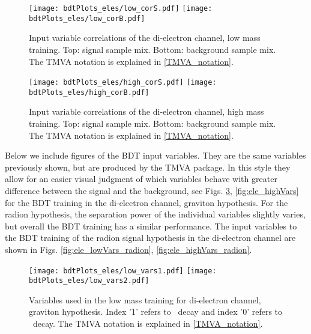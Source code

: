 \begin{figure}[tbp]
\begin{center}
\texttt{[image: bdtPlots\_eles/low\_corS.pdf]}
\texttt{[image: bdtPlots\_eles/low\_corB.pdf]}
\caption[Input variable correlations of the di-electron channel, low mass training.]{ Input variable correlations of the di-electron channel, low mass training. Top: signal sample mix. Bottom: background sample mix. The TMVA notation is explained in \ref{TMVA_notation}.}
\label{fig:ele_cors_low}
\end{center}
\end{figure}

\begin{figure}[tbp]
\begin{center}
\texttt{[image: bdtPlots\_eles/high\_corS.pdf]}
\texttt{[image: bdtPlots\_eles/high\_corB.pdf]}
\caption[Input variable correlations of the di-electron channel, high mass training.]{ Input variable correlations of the di-electron channel, high mass training. Top: signal sample mix. Bottom: background sample mix. The TMVA notation is explained in \ref{TMVA_notation}.}
\label{fig:ele_cors_high}
\end{center}
\end{figure}

Below we include figures of the BDT input variables. They are the same variables previously shown, but are produced by the TMVA package. In this style they allow for an easier visual judgment of which variables behave with greater difference between the signal and the background, see Figs. \ref{fig:ele_lowVars}, \ref{fig:ele_highVars} for the BDT training in the di-electron channel, graviton hypothesis. For the radion hypothesis, the separation power of the individual variables slightly varies, but overall the BDT training has a similar performance. The input variables to the BDT training of the radion signal hypothesis in the di-electron channel are shown in Figs. \ref{fig:ele_lowVars_radion}, \ref{fig:ele_highVars_radion}.

\begin{figure}[H]
\begin{center}
\texttt{[image: bdtPlots\_eles/low\_vars1.pdf]}
\texttt{[image: bdtPlots\_eles/low\_vars2.pdf]}
\caption[Variables used in the low mass training for di-electron channel, graviton hypothesis.]{ Variables used in the low mass training for di-electron channel, graviton hypothesis. Index '1' refers to \HBB~decay and index '0' refers to \HZZ~decay. The TMVA notation is explained in \ref{TMVA_notation}.}
\label{fig:ele_lowVars}
\end{center}
\end{figure}

